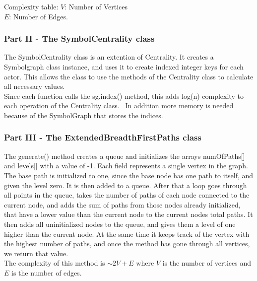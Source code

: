 \documentclass[11pt]{article}
\begin{document}
\begin{minipage}[b]{0.5\linewidth}\centering
{}
\small{Complexity table: $V$: Number of Vertices \\$E$: Number of Edges.} 
\end{minipage}

\subsubsection*{Part II - The SymbolCentrality class}
The SymbolCentrality class is an extention of Centrality. It creates a Symbolgraph class instance, and uses it to create indexed integer keys for each actor.
This allows the class to use the methods of the Centrality class to calculate all necessary values. \\
Since each function calls the sg.index() method, this adds log(n) complexity to each operation of the Centrality class. 
In addition more memory is needed because of the SymbolGraph that stores the indices.

\subsubsection*{Part III - The ExtendedBreadthFirstPaths class}
The generate() method creates a queue and initializes the arrays numOfPaths[] and levels[] with a value of -1. Each field
represents a single vertex in the graph. The base path is initialized to one, since the base node has one path to itself, and given the level zero. It is then 
added to a queue. After that a loop goes through all points in the queue, takes the number of paths of each node connected to the current node, and adds the sum
of paths from those nodes already initialized, that have a lower value than the current node to the current nodes total paths. It then adds all uninitialized nodes
to the queue, and gives them a level of one higher than the current node. At the same time it keeps track of the vertex with the highest number of paths, 
and once the method has gone through all vertices, we return that value. \\
The complexity of this method is $\sim2V+E$ where $V$ is the number of vertices and $E$ is the number of edges.
\end{document}
